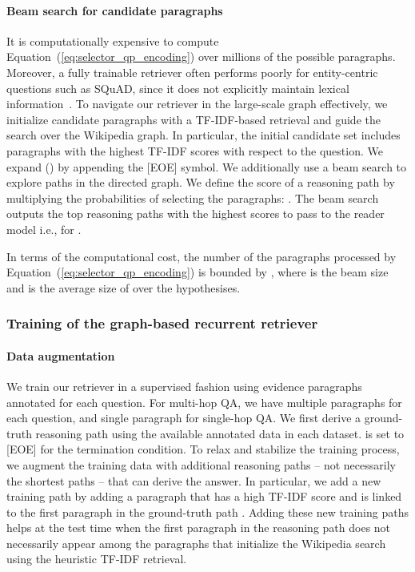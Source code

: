 \documentclass{article} \usepackage{iclr2020_conference,times}
\begin{document}
\vspace{-2mm}\paragraph{Beam search for candidate paragraphs}
It is computationally expensive to compute Equation~(\ref{eq:selector_qp_encoding}) over millions of the possible paragraphs. Moreover, a fully trainable retriever often performs poorly for entity-centric questions such as SQuAD, since it does not explicitly maintain lexical information~\citep{lee-chang-toutanova:2019:ACL2019}.
To navigate our retriever in the large-scale graph effectively, we initialize candidate paragraphs with a TF-IDF-based retrieval and guide the search over the Wikipedia graph.
In particular, the initial candidate set  includes  paragraphs with the highest TF-IDF scores with respect to the question.
We expand  () by appending the [EOE] symbol.
We additionally use a beam search to explore paths in the directed graph.
We define the score of a reasoning path  by multiplying the probabilities  of selecting the paragraphs: .
The beam search outputs the top  reasoning paths  with the highest scores to pass to the reader model i.e.,   for .

In terms of the computational cost, the number of the paragraphs processed by Equation~(\ref{eq:selector_qp_encoding}) is bounded by , where  is the beam size and  is the average size of  over the  hypothesises.

\subsubsection{Training of the graph-based recurrent retriever}
\label{subsubsec:training_selector}

\vspace{-2mm}\paragraph{Data augmentation}
We train our retriever in a supervised fashion using evidence paragraphs annotated for each question.
For multi-hop QA, we have multiple paragraphs for each question, and single paragraph for single-hop QA.
We first derive a ground-truth reasoning path  using the available annotated data in each dataset.
 is set to [EOE] for the termination condition.
To relax and stabilize the training process, we augment the training data with additional  reasoning paths -- not necessarily the shortest paths -- that can derive the answer.
In particular, we add a new training path  by adding a paragraph  that has a high TF-IDF score and is linked to the first paragraph  in the ground-truth path .
Adding these new training paths helps at the test time when the first paragraph in the reasoning path does not necessarily appear among the paragraphs that initialize the Wikipedia search using the heuristic TF-IDF retrieval. 
\end{document}
